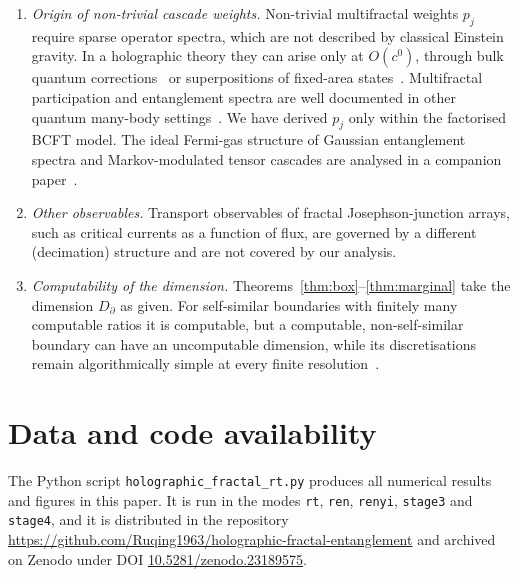 \documentclass[11pt]{article}
\theoremstyle{definition}\newtheorem{definition}{Definition}[section]
\theoremstyle{remark}\newtheorem*{remark}{Remark}
\begin{document}
\begin{enumerate}
$x_q$, and in $d=2$ it is the Calabrese--Lefevre spectrum. The factorisation of R\'enyi entropies for
fractal surfaces in Section~\ref{sec:renyi} is a leading-order approximation that we have not proven.
\item \emph{Origin of non-trivial cascade weights.} Non-trivial multifractal weights $p_j$ require sparse
operator spectra, which are not described by classical Einstein gravity. In a holographic theory they can
arise only at $O(c^0)$, through bulk quantum corrections~\cite{FLM} or superpositions of fixed-area
states~\cite{DHM,AkersRath}. Multifractal participation and entanglement spectra are well documented in
other quantum many-body settings~\cite{LAL}. We have derived $p_j$ only within the factorised BCFT model. The ideal Fermi-gas structure of Gaussian entanglement spectra and Markov-modulated tensor cascades are analysed in a companion paper~\cite{Chen2026_mqe}.
\item \emph{Other observables.} Transport observables of fractal Josephson-junction arrays, such as
critical currents as a function of flux, are governed by a different (decimation) structure and are not
covered by our analysis.
\item \emph{Computability of the dimension.} Theorems~\ref{thm:box}--\ref{thm:marginal} take the dimension
$D_\partial$ as given. For self-similar boundaries with finitely many computable ratios it is computable, but a
computable, non-self-similar boundary can have an uncomputable dimension, while its discretisations remain
algorithmically simple at every finite resolution~\cite{Chen2026_chaitin}.
\end{enumerate}

\section*{Data and code availability}
The Python script \texttt{holographic\_fractal\_rt.py} produces all numerical results and figures in this paper.
It is run in the modes \texttt{rt}, \texttt{ren}, \texttt{renyi}, \texttt{stage3} and \texttt{stage4}, and it is distributed in the
repository
\url{https://github.com/Ruqing1963/holographic-fractal-entanglement} and archived on Zenodo under DOI
\href{https://doi.org/10.5281/zenodo.23189575}{10.5281/zenodo.23189575}.

\appendix
\end{document}
